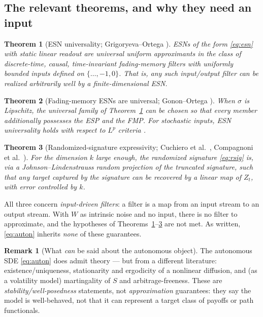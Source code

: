 \documentclass[11pt]{article}
\theoremstyle{definition}
\newtheorem{remark}{Remark}[section]
\theoremstyle{plain}
\newtheorem{theorem}{Theorem}[section]
\begin{document}
\subsection{The relevant theorems, and why they need an input}
\label{sec:theorems}

\begin{theorem}[ESN universality; Grigoryeva--Ortega \cite{grigoryeva2018}]
\label{thm:go}
ESNs of the form \eqref{eq:esn} with static linear readout are universal uniform approximants in the class of discrete-time, causal, time-invariant \emph{fading-memory filters with uniformly bounded inputs} defined on $\{\dots,-1,0\}$. That is, any such input/output filter can be realized arbitrarily well by a finite-dimensional ESN.
\end{theorem}

\begin{theorem}[Fading-memory ESNs are universal; Gonon--Ortega \cite{gonon2021}]
\label{thm:gono}
When $\sigma$ is Lipschitz, the universal family of Theorem~\ref{thm:go} can be chosen so that every member additionally possesses the ESP and the FMP. For stochastic inputs, ESN universality holds with respect to $L^p$ criteria \cite{gononortega2020}.
\end{theorem}

\begin{theorem}[Randomized-signature expressivity; Cuchiero et al.\ \cite{cuchiero2021expressive,cuchiero2022discrete}, Compagnoni et al.\ \cite{compagnoni2023}]
\label{thm:rsig}
For the dimension $k$ large enough, the randomized signature \eqref{eq:rsig} is, via a Johnson--Lindenstrauss random projection of the truncated signature, such that any target captured by the signature can be recovered by a \emph{linear} map of $Z_t$, with error controlled by $k$.
\end{theorem}

All three concern \emph{input-driven filters}: a filter is a map from an input stream to an output stream. With $W$ as intrinsic noise and no input, there is no filter to approximate, and the hypotheses of Theorems~\ref{thm:go}--\ref{thm:rsig} are not met. As written, \eqref{eq:auton} inherits \emph{none} of these guarantees.

\begin{remark}[What \emph{can} be said about the autonomous object]
The autonomous SDE \eqref{eq:auton} does admit theory --- but from a different literature: existence/uniqueness, stationarity and ergodicity of a nonlinear diffusion, and (as a volatility model) martingality of $S$ and arbitrage-freeness. These are \emph{stability/well-posedness} statements, not \emph{approximation} guarantees: they say the model is well-behaved, not that it can represent a target class of payoffs or path functionals.
\end{remark}
\end{document}
